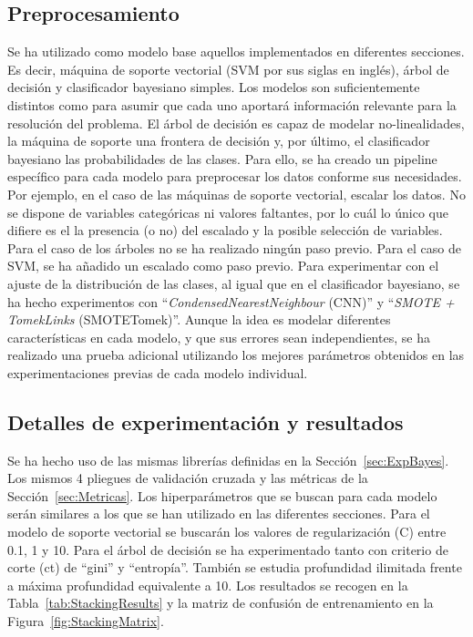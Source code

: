\documentclass[12pt,letterpaper]{article}
\begin{document}
\subsection{Preprocesamiento}
Se ha utilizado como modelo base aquellos implementados en diferentes secciones. Es decir, máquina de soporte vectorial (SVM por sus siglas en inglés), árbol de decisión y clasificador bayesiano simples. 
Los modelos son suficientemente distintos como para asumir que cada uno aportará información relevante para la resolución del problema. El árbol de decisión es capaz de modelar no-linealidades, la máquina de soporte una 
frontera de decisión y, por último, el clasificador bayesiano las probabilidades de las clases.
Para ello, se ha creado un pipeline específico para cada modelo para preprocesar los datos conforme sus necesidades. Por ejemplo, en el caso de las máquinas de soporte vectorial, escalar los datos. 
No se dispone de variables categóricas ni valores faltantes, por lo cuál lo único que difiere es el la presencia (o no) del escalado y la posible selección de variables.
Para el caso de los árboles no se ha realizado ningún paso previo. Para el caso de SVM, se ha añadido un escalado como paso previo. 
Para experimentar con el ajuste de la distribución de las clases, al igual que en el clasificador bayesiano, se ha hecho experimentos con ``\textit{CondensedNearestNeighbour} (CNN)'' y ``\textit{SMOTE + TomekLinks} (SMOTETomek)''.
Aunque la idea es modelar diferentes características en cada modelo, y que sus errores sean independientes, se ha realizado una prueba adicional utilizando los mejores parámetros obtenidos en las experimentaciones previas de cada modelo individual.
\subsection{Detalles de experimentación y resultados} 
Se ha hecho uso de las mismas librerías definidas en la Sección~\ref{sec:ExpBayes}. Los mismos 4 pliegues de validación cruzada y las métricas de la Sección~\ref{sec:Metricas}.
Los hiperparámetros que se buscan para cada modelo serán similares a los que se han utilizado en las diferentes secciones.
Para el modelo de soporte vectorial se buscarán los valores de regularización (C) entre 0.1, 1 y 10.
Para el árbol de decisión se ha experimentado tanto con criterio de corte (ct) de ``gini'' y ``entropía''. También se estudia profundidad ilimitada frente a máxima profundidad equivalente a 10.
Los resultados se recogen en la Tabla~\ref{tab:StackingResults} y la matriz de confusión de entrenamiento en la Figura~\ref{fig:StackingMatrix}.
\end{document}
